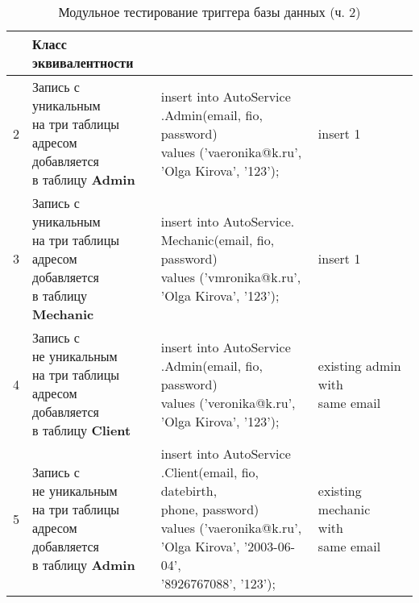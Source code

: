 \begin{table}[H]
	\centering
	\caption{\label{tab:teststrigger2}Модульное тестирование триггера базы данных (ч. 2)}
	\begin{tabular}{|l|l|l|l|}
		\hline \specialcell{№} & \specialcell{Класс\\эквивалентности} & \specialcell{Запрос для теста} & \specialcell{Результат}\\\hline
		2 & \makecell{Запись с уникальным\\на три таблицы\\адресом добавляется\\в таблицу \textbf{Admin}} & \makecell{insert into AutoService\\.Admin(email, fio,\\ password)\\values ('vaeronika@k.ru',\\'Olga Kirova', '123');} & insert 1 \\\hline
		3 & \makecell{Запись с уникальным\\на три таблицы\\адресом добавляется\\в таблицу \textbf{Mechanic}} & \makecell{insert into AutoService.\\Mechanic(email, fio,\\ password)\\values ('vmronika@k.ru',\\'Olga Kirova', '123');} & insert 1 \\\hline
		4 & \makecell{Запись с\\не уникальным\\на три таблицы\\адресом добавляется\\в таблицу \textbf{Client}} & \makecell{insert into AutoService\\.Admin(email, fio,\\ password)\\values ('veronika@k.ru',\\'Olga Kirova', '123');} & \makecell{existing admin\\with\\same email} \\\hline
		5 & \makecell{Запись с\\не уникальным\\на три таблицы\\адресом добавляется\\в таблицу \textbf{Admin}} & \makecell{insert into AutoService\\.Client(email, fio, datebirth,\\phone, password)\\values ('vaeronika@k.ru',\\'Olga Kirova', '2003-06-04',\\'8926767088', '123');} & \makecell{existing mechanic\\with\\same email} \\\hline

\end{tabular}
\end{table}

